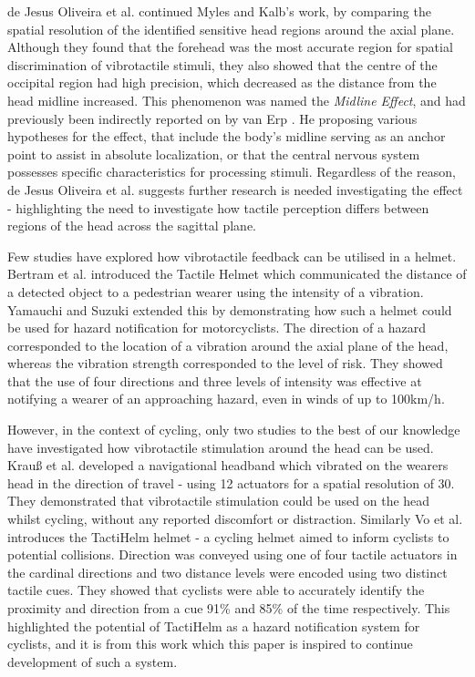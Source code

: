 \documentclass{mpaper}
\begin{document}
de Jesus Oliveira et al. \cite{7463147} continued Myles and Kalb's work, by comparing the spatial resolution of the identified sensitive head regions around the axial plane. Although they found that the forehead was the most accurate region for spatial discrimination of vibrotactile stimuli, they also showed that the centre of the occipital region had high precision, which decreased as the distance from the head midline increased. This phenomenon was named the \textit{Midline Effect}, and had previously been indirectly reported on by van Erp \cite{1406917}. He proposing various hypotheses for the effect, that include the body's midline serving as an anchor point to assist in absolute localization, or that the central nervous system possesses specific characteristics for processing stimuli. Regardless of the reason, de Jesus Oliveira et al. suggests further research is needed investigating the effect - highlighting the need to investigate how tactile perception differs between regions of the head across the sagittal plane.

Few studies have explored how vibrotactile feedback can be utilised in a helmet. Bertram et al. introduced the Tactile Helmet \cite{10.1007/978-3-642-39802-5_3} which communicated the distance of a detected object to a pedestrian wearer using the intensity of a vibration. Yamauchi and Suzuki \cite{yamauchi2020vibro} extended this by demonstrating how such a helmet could be used for hazard notification for motorcyclists. The direction of a hazard corresponded to the location of a vibration around the axial plane of the head, whereas the vibration strength corresponded to the level of risk. They showed that the use of four directions and three levels of intensity was effective at notifying a wearer of an approaching hazard, even in winds of up to 100km/h.

However, in the context of cycling, only two studies to the best of our knowledge have investigated how vibrotactile stimulation around the head can be used. Krau{\ss} et al. \cite{krauss2021head} developed a navigational headband which vibrated on the wearers head in the direction of travel - using 12 actuators for a spatial resolution of 30\degree{}. They demonstrated that vibrotactile stimulation could be used on the head whilst cycling, without any reported discomfort or distraction. Similarly Vo et al. introduces the TactiHelm helmet \cite{10.1145/3411763.3451580} - a cycling helmet aimed to inform cyclists to potential collisions. Direction was conveyed using one of four tactile actuators in the cardinal directions and two distance levels were encoded using two distinct tactile cues. They showed that cyclists were able to accurately identify the proximity and direction from a cue 91\% and 85\% of the time respectively. This highlighted the potential of TactiHelm as a hazard notification system for cyclists, and it is from this work which this paper is inspired to continue development of such a system.
\end{document}
